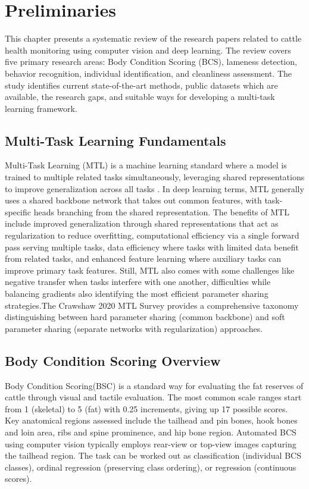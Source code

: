 \section{Preliminaries}

This chapter presents a systematic review of the research papers related to cattle health monitoring using computer vision and deep learning. The review covers five primary research areas: Body Condition Scoring (BCS), lameness detection, behavior recognition, individual identification, and cleanliness assessment. The study identifies current state-of-the-art methods, public datasets which are available, the research gaps, and suitable ways for developing a multi-task learning framework.

\subsection{Multi-Task Learning Fundamentals}

Multi-Task Learning (MTL) is a machine learning standard where a model is trained to multiple related tasks simultaneously, leveraging shared representations to improve generalization across all tasks \cite{crawshaw2020mtl}. In deep learning terms, MTL generally uses a shared backbone network that takes out common features, with task-specific heads branching from the shared representation. The benefits of MTL include improved generalization through shared representations that act as regularization to reduce overfitting, computational efficiency via a single forward pass serving multiple tasks, data efficiency where tasks with limited data benefit from related tasks, and enhanced feature learning where auxiliary tasks can improve primary task features. Still, MTL also comes with some challenges like negative transfer when tasks interfere with one another, difficulties while balancing gradients also identifying the most efficient parameter sharing strategies.The Crawshaw 2020 MTL Survey provides a comprehensive taxonomy distinguishing between hard parameter sharing (common backbone) and soft parameter sharing (separate networks with regularization) approaches.

\subsection{Body Condition Scoring Overview}

Body Condition Scoring(BSC) is a standard way for evaluating the fat reserves of cattle through visual and tactile evaluation. The most common scale ranges start from 1 (skeletal) to 5 (fat) with 0.25 increments, giving up 17 possible scores. Key anatomical regions assessed include the tailhead and pin bones, hook bones and loin area, ribs and spine prominence, and hip bone region. Automated BCS using computer vision typically employs rear-view or top-view images capturing the tailhead region. The task can be worked out as classification (individual BCS classes), ordinal regression (preserving class ordering), or regression (continuous scores).

